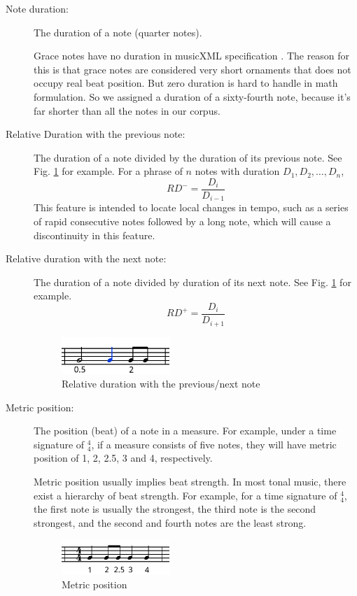 \begin{description}
         
         \item [Note duration:] The duration of a note (quarter notes). 

            Grace notes have no duration in musicXML specification \cite{musicxml}. The reason for this is that grace notes are considered very short ornaments that does not occupy real beat position. But zero duration is hard to handle in math formulation. So we assigned a duration of a sixty-fourth note, because it's far shorter than all the notes in our corpus.
         \item [Relative Duration with the previous note:] The duration of a note divided by the duration of its previous note. See Fig. \ref{fig:duration} for example.
For a phrase of $n$ notes with duration $D_1, D_2, \dots, D_n$, $$RD^- = \frac{D_i}{D_{i-1}} $$             This feature is intended to locate local changes in tempo, such as a series of rapid consecutive notes followed by a long note, which will cause a discontinuity in this feature.
         \item [Relative duration with the next note:] The duration of a note divided by duration of its next note. See Fig. \ref{fig:duration} for example.
$$RD^+ = \frac{D_i}{D_{i+1}} $$ 

      \begin{figure}[tp]
         \begin{center}
            \includegraphics[width=0.4\textwidth]{fig/duration}
         \end{center}
         \caption{Relative duration with the previous/next note}
         \label{fig:duration}
      \end{figure}
   \item [Metric position:] The position (beat) of a note in a measure. For example, under a time signature of $^4_4$, if a measure consists of five notes, they will have metric position of 1, 2, 2.5, 3 and 4, respectively. 
      
      Metric position usually implies beat strength. In most tonal music, there exist a hierarchy of beat strength. For example, for a time signature of $^4_4$, the first note is usually the strongest, the third note is the second strongest, and the second and fourth notes are the least strong. %

   \begin{figure}[tp]
      \begin{center}
         \includegraphics[width=0.4\textwidth]{fig/metrical}
      \end{center}
      \caption{Metric position}
      \label{fig:metrical}
   \end{figure}
      \end{description}

